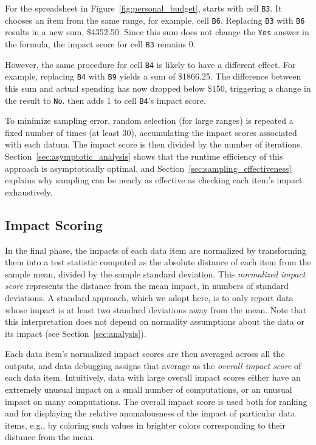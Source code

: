 For the spreadsheet in Figure~\ref{fig:personal_budget}, \checkcell{}
starts with cell \texttt{B3}. It chooses an item from the same
range, for example, cell \texttt{B6}. Replacing \texttt{B3}
with \texttt{B6} results in a new sum, \$4352.50. Since this sum does
not change the \texttt{Yes} answer in the formula, the impact score
for cell \texttt{B3} remains 0.

However, the same procedure for cell \texttt{B4} is likely to have a
different effect.  For example, replacing \texttt{B4}
with \texttt{B9} yields a sum of \$1866.25. The difference
between this sum and actual spending has now dropped below \$150,
triggering a change in the result to \texttt{No}. \checkcell{} then
adds 1 to cell \texttt{B4}'s impact score.


To minimize sampling error, random
selection (for large ranges) is repeated a fixed number of times (at least 30),
accumulating the impact scores associated with each datum. The impact
score is then divided by the number of
iterations. Section~\ref{sec:asymptotic_analysis} shows that the
runtime efficiency of this approach is asymptotically optimal, and
Section~\ref{sec:sampling_effectiveness} explains why sampling can be nearly as
effective as checking each item's impact exhaustively.

\subsection{Impact Scoring}

In the final phase, the impacts of each data item are normalized by transforming
them into a test statistic computed as the absolute distance of
each item from the sample mean, divided by the sample standard
deviation. This \emph{normalized impact score} represents the distance
from the mean impact, in numbers of standard deviations. A standard
approach, which we adopt here, is to only report data whose impact is
at least two standard deviations away from the mean.  Note
that this interpretation does not depend on normality assumptions
about the data or its impact (see Section~\ref{sec:analysis}).

Each data item's normalized impact scores are then averaged across
all the outputs, and data debugging assigns that average as the
\emph{overall impact score} of each data item. Intuitively, data with
large overall impact scores either have an extremely unusual impact on a
small number of computations, or an unusual impact on many
computations. The overall impact score is used both for ranking and
for displaying the relative anomalousness of the impact of particular
data items, e.g., by coloring such values in brighter colors
corresponding to their distance from the mean.

